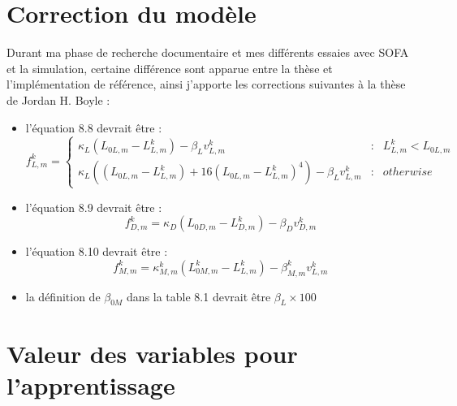 \cleardoublepage
\chapter{Correction du modèle} %
\label{cha:Correction du modèle}

Durant ma phase de recherche documentaire et mes différents essaies avec
SOFA et la simulation, certaine différence sont apparue entre la thèse
et l'implémentation de référence, ainsi j'apporte les corrections suivantes
à la thèse de Jordan H. Boyle \cite{Boyle2009} :
\begin{itemize}
   \item l'équation 8.8 devrait être :
      \begin{equation}
      f^k_{L,m} = \left\{ 
         \begin{array}{rcl}
            \kappa_L(L_{0L,m} - L_{L,m}^k) - \beta_{L}v_{L,m}^k & : & L_{L,m}^k < L_{0L,m}\\
            \kappa_L((L_{0L,m} - L_{L,m}^k) + 16(L_{0L,m} - L_{L,m}^k)^4) - \beta_{L}v_{L,m}^k & : & otherwise
         \end{array}
         \right.
      \end{equation}
   \item l'équation 8.9 devrait être :
      \begin{equation}
      f_{D,m}^k = \kappa_D(L_{0D,m} - L_{D,m}^k) - \beta_{D}v_{D,m}^k
      \end{equation}
   \item l'équation 8.10 devrait être :
      \begin{equation}
      f_{M,m}^k = \kappa_{M,m}^k(L_{0M,m}^k - L_{L,m}^k) - \beta_{M,m}^{k}v_{L,m}^k
      \end{equation}
   \item la définition de $\beta_{0M}$ dans la table 8.1 devrait être $\beta_L \times 100$
\end{itemize}


\cleardoublepage
\chapter{Valeur des variables pour l'apprentissage} %
\label{cha:Valeur des variables pour l'apprentissage}

